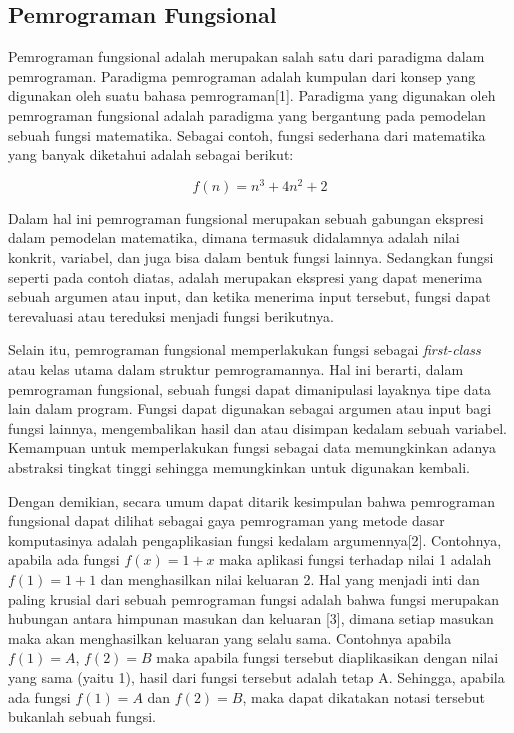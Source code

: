 \documentclass[pi.tex]{subfile}
\begin{document}
\subsection{Pemrograman Fungsional}\hspace{5pt}
Pemrograman fungsional adalah merupakan salah satu dari paradigma dalam pemrograman. Paradigma pemrograman adalah kumpulan dari konsep yang digunakan oleh suatu bahasa pemrograman[1]. Paradigma yang digunakan oleh pemrograman fungsional adalah paradigma yang bergantung pada pemodelan sebuah fungsi matematika. Sebagai contoh, fungsi sederhana dari matematika yang banyak diketahui adalah sebagai berikut:

\begin{equation}
  f(n) = n^3 + 4n^2 + 2
\end{equation}

\hspace{5pt}Dalam hal ini pemrograman fungsional merupakan sebuah gabungan ekspresi dalam pemodelan matematika, dimana termasuk didalamnya adalah nilai konkrit, variabel, dan juga bisa dalam bentuk fungsi lainnya. Sedangkan fungsi seperti pada contoh diatas, adalah merupakan ekspresi yang dapat menerima sebuah argumen atau input, dan ketika menerima input tersebut, fungsi dapat terevaluasi atau tereduksi menjadi fungsi berikutnya.

\hspace{5pt}Selain itu, pemrograman fungsional memperlakukan fungsi sebagai \emph{first-class} atau kelas utama dalam struktur pemrogramannya. Hal ini berarti, dalam pemrograman fungsional, sebuah fungsi dapat dimanipulasi layaknya tipe data lain dalam program. Fungsi dapat digunakan sebagai argumen atau input bagi fungsi lainnya, mengembalikan hasil dan atau disimpan kedalam sebuah variabel. Kemampuan untuk memperlakukan fungsi sebagai data memungkinkan adanya abstraksi tingkat tinggi sehingga memungkinkan untuk digunakan kembali.

\hspace{5pt}Dengan demikian, secara umum dapat ditarik kesimpulan bahwa pemrograman fungsional dapat dilihat sebagai gaya pemrograman yang metode dasar komputasinya adalah pengaplikasian fungsi kedalam argumennya[2]. Contohnya, apabila ada fungsi $f(x) = 1 + x$ maka aplikasi fungsi terhadap nilai 1 adalah $f(1) = 1 + 1$ dan menghasilkan nilai keluaran 2. Hal yang menjadi inti dan paling krusial dari sebuah pemrograman fungsi adalah bahwa fungsi merupakan hubungan antara himpunan masukan dan keluaran [3], dimana setiap masukan maka akan menghasilkan keluaran yang selalu sama. Contohnya apabila $f(1) = A$, $f(2) = B$ maka apabila fungsi tersebut diaplikasikan dengan nilai yang sama (yaitu 1), hasil dari fungsi tersebut adalah tetap A. Sehingga, apabila ada fungsi $f(1) = A$ dan $f(2) = B$, maka dapat dikatakan notasi tersebut bukanlah sebuah fungsi.
\end{document}
